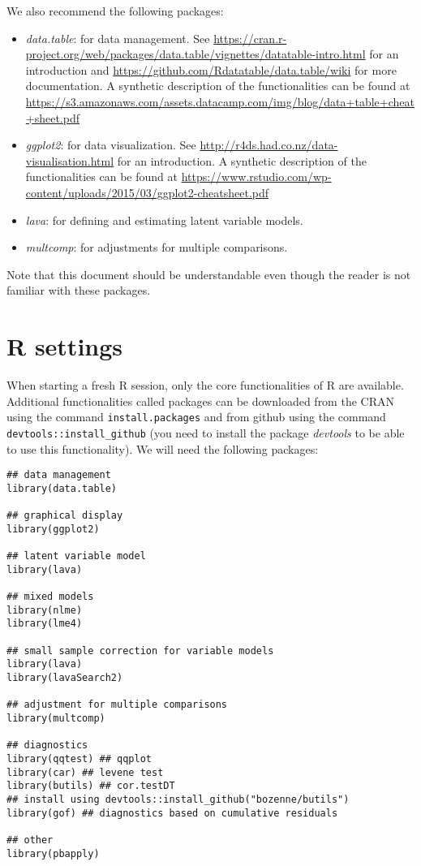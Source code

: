 \documentclass{article}
\begin{document}
We also recommend the following packages:
\begin{itemize}
\item \emph{data.table}: for data management. See
\url{https://cran.r-project.org/web/packages/data.table/vignettes/datatable-intro.html}
for an introduction and
\url{https://github.com/Rdatatable/data.table/wiki} for more
documentation.  A synthetic description of the functionalities can
be found at
\url{https://s3.amazonaws.com/assets.datacamp.com/img/blog/data+table+cheat+sheet.pdf}
\item \emph{ggplot2}: for data visualization. See
\url{http://r4ds.had.co.nz/data-visualisation.html} for an introduction. A
synthetic description of the functionalities can be found at
\url{https://www.rstudio.com/wp-content/uploads/2015/03/ggplot2-cheatsheet.pdf}
\item \emph{lava}: for defining and estimating latent variable models.
\item \emph{multcomp}: for adjustments for multiple comparisons.
\end{itemize}
Note that this document should be understandable even though the
reader is not familiar with these packages.


\clearpage

\tableofcontents

\clearpage

\section{R settings}
\label{sec:org336005c}

When starting a fresh R session, only the core functionalities of R
are available. Additional functionalities called packages can be
downloaded from the CRAN using the command \texttt{install.packages} and from
github using the command \texttt{devtools::install\_github} (you need to
install the package \emph{devtools} to be able to use this functionality). We
will need the following packages:
\lstset{language=r,label= ,caption= ,captionpos=b,numbers=none}
\begin{lstlisting}
## data management
library(data.table)

## graphical display
library(ggplot2)

## latent variable model
library(lava)

## mixed models
library(nlme)
library(lme4)

## small sample correction for variable models
library(lava)
library(lavaSearch2)

## adjustment for multiple comparisons
library(multcomp)

## diagnostics
library(qqtest) ## qqplot
library(car) ## levene test
library(butils) ## cor.testDT 
## install using devtools::install_github("bozenne/butils")
library(gof) ## diagnostics based on cumulative residuals

## other 
library(pbapply)
\end{lstlisting}
\end{document}
